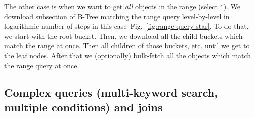 \documentclass[notitlepage]{revtex4-1}
\newcommand{\figref}[1]{Fig.~\ref{#1}}
\begin{document}
The other case is when we want to get \emph{all} objects in the range (select *).
We download subsection of B-Tree matching the range query level-by-level in logarithmic number of steps in this case~\figref{fig:range-query-star}.
To do that, we start with the root bucket.
Then, we download all the child buckets which match the range at once.
Then all children of those buckets, etc. until we get to the leaf nodes.
After that we (optionally) bulk-fetch all the objects which match the range query at once.

\subsection{Complex queries (multi-keyword search, multiple conditions) and joins}

%




\end{document}
